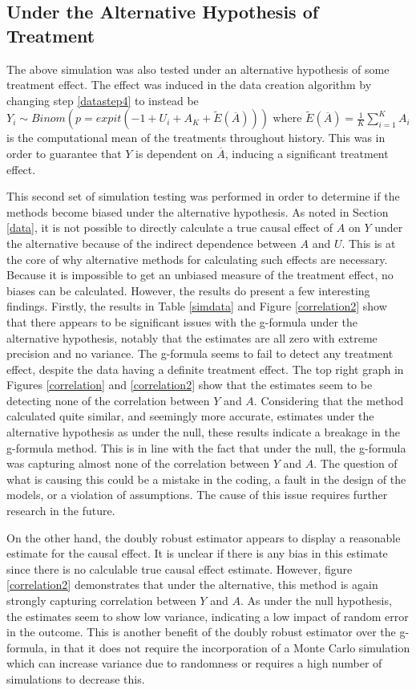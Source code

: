 \subsection{Under the Alternative Hypothesis of Treatment} \label{alternative}
The above simulation was also tested under an alternative hypothesis of some treatment effect.  The effect was induced in the data creation algorithm by changing step \ref{datastep4} to instead be $Y_i \sim Binom(p = expit(-1+U_i + A_K + \tilde{E}(\overline{A})))$ where $\tilde{E}(\overline{A}) = \frac{1}{K} \sum_{i=1}^K A_i $ is the computational mean of the treatments throughout history.  This was in order to guarantee that $Y$ is dependent on $\overline{A}$, inducing a significant treatment effect.  

This second set of simulation testing was performed in order to determine if the methods become biased under the alternative hypothesis.  As noted in Section \ref{data}, it is not possible to directly calculate a true causal effect of $A$ on $Y$ under the alternative because of the indirect dependence between $A$ and $U$.  This is at the core of why alternative methods for calculating such effects are necessary.  Because it is impossible to get an unbiased measure of the treatment effect, no biases can be calculated.  However, the results do present a few interesting findings.  Firstly, the results in Table \ref{simdata} and Figure \ref{correlation2} show that there appears to be significant issues with the g-formula under the alternative hypothesis, notably that the estimates are all zero with extreme precision and no variance.  The g-formula seems to fail to detect any treatment effect, despite the data having a definite treatment effect.  The top right graph in Figures \ref{correlation} and \ref{correlation2} show that the estimates seem to be detecting none of the correlation between $Y$ and $A$.  Considering that the method calculated quite similar, and seemingly more accurate, estimates under the alternative hypothesis as under the null, these results indicate a breakage in the g-formula method.  This is in line with the fact that under the null, the g-formula was capturing almost none of the correlation between $Y$ and $A$.  The question of what is causing this could be a mistake in the coding, a fault in the design of the models, or a violation of assumptions.  The cause of this issue requires further research in the future.  

On the other hand, the doubly robust estimator appears to display a reasonable estimate for the causal effect.  It is unclear if there is any bias in this estimate since there is no calculable true causal effect estimate.  However, figure \ref{correlation2} demonstrates that under the alternative, this method is again strongly capturing correlation between $Y$ and $A$.  As under the null hypothesis, the estimates seem to show low variance, indicating a low impact of random error in the outcome.  This is another benefit of the doubly robust estimator over the g-formula, in that it does not require the incorporation of a Monte Carlo simulation which can increase variance due to randomness or requires a high number of simulations to decrease this.  

